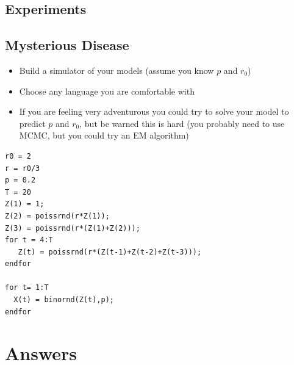 \documentclass[11pt]{article}
\begin{document}
\subsection{Experiments}
\label{sec:org50cb3a8}

\subsection{Mysterious Disease}
\label{sec:org5e51451}
\begin{itemize}
\item Build a simulator of your models (assume you know \(p\) and \(r_0\))
\item Choose any language you are comfortable with
\item If you are feeling very adventurous you could try to solve your
model to predict \(p\) and \(r_0\), but be warned this is hard (you
probably need to use MCMC, but you could try an EM algorithm)
\end{itemize}

\begin{verbatim}
r0 = 2
r = r0/3
p = 0.2
T = 20
Z(1) = 1;
Z(2) = poissrnd(r*Z(1));
Z(3) = poissrnd(r*(Z(1)+Z(2)));
for t = 4:T
   Z(t) = poissrnd(r*(Z(t-1)+Z(t-2)+Z(t-3)));
endfor

for t= 1:T
  X(t) = binornd(Z(t),p);
endfor
\end{verbatim}

\section{Answers}
\label{sec:orgeef2036}
\end{document}
